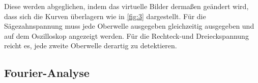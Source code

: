 \noindent Diese werden abgeglichen, indem das virtuelle Bilder dermaßen geändert wird, 
dass sich die Kurven überlagern wie in \autoref{fig:3} dargestellt.
Für die Sägezahnspannung muss jede Oberwelle ausgegeben gleichzeitig ausgegeben 
und auf dem Oszilloskop angezeigt werden.
Für die Rechteck-und Dreieckspannung reicht es, jede zweite Oberwelle derartig 
zu detektieren.

\subsection{Fourier-Analyse}